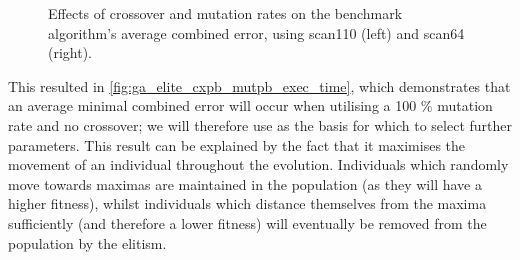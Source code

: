 \documentclass[authoryearcitations]{UoYCSproject}
\begin{document}
\begin{figure}
\begin{subfigure}[b]{0.5\textwidth}
\end{subfigure}
\begin{subfigure}[b]{0.5\textwidth}
\end{subfigure}
	\caption[Optimising crossover \& mutation rates for elitist selection.]{Effects of crossover and mutation rates on the benchmark algorithm's average combined error, using scan110 (left) and scan64 (right).}
	\label{fig:ga_elite_cxpb_mutpb_exec_time}
\end{figure}

This resulted in \autoref{fig:ga_elite_cxpb_mutpb_exec_time}, which demonstrates that an average minimal combined error will occur when utilising a 100 \% mutation rate and no crossover; we will therefore use as the basis for which to select further parameters. This result can be explained by the fact that it maximises the movement of an individual throughout the evolution. Individuals which randomly move towards maximas are maintained in the population (as they will have a higher fitness), whilst individuals which distance themselves from the maxima sufficiently (and therefore a lower fitness) will eventually be removed from the population by the elitism.
\end{document}
